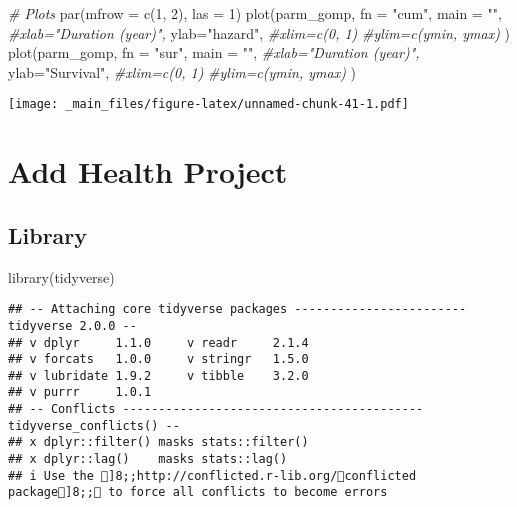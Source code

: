 \documentclass[
]{book}
\newenvironment{Shaded}{\begin{snugshade}}{\end{snugshade}}
\newcommand{\AttributeTok}[1]{\textcolor[rgb]{0.77,0.63,0.00}{#1}}
\newcommand{\CommentTok}[1]{\textcolor[rgb]{0.56,0.35,0.01}{\textit{#1}}}
\newcommand{\DecValTok}[1]{\textcolor[rgb]{0.00,0.00,0.81}{#1}}
\newcommand{\FunctionTok}[1]{\textcolor[rgb]{0.00,0.00,0.00}{#1}}
\newcommand{\NormalTok}[1]{#1}
\newcommand{\StringTok}[1]{\textcolor[rgb]{0.31,0.60,0.02}{#1}}
\begin{document}
\begin{Shaded}
\begin{Highlighting}[]
\CommentTok{\# Plots}
\FunctionTok{par}\NormalTok{(}\AttributeTok{mfrow =} \FunctionTok{c}\NormalTok{(}\DecValTok{1}\NormalTok{, }\DecValTok{2}\NormalTok{), }\AttributeTok{las =} \DecValTok{1}\NormalTok{)}
\FunctionTok{plot}\NormalTok{(parm\_gomp, }
     \AttributeTok{fn =} \StringTok{"cum"}\NormalTok{, }\AttributeTok{main =} \StringTok{""}\NormalTok{, }
     \CommentTok{\#xlab="Duration (year)", }
     \AttributeTok{ylab=}\StringTok{"hazard"}\NormalTok{,}
     \CommentTok{\#xlim=c(0, 1) }
     \CommentTok{\#ylim=c(ymin, ymax)}
\NormalTok{     )}
\FunctionTok{plot}\NormalTok{(parm\_gomp, }
     \AttributeTok{fn =} \StringTok{"sur"}\NormalTok{, }\AttributeTok{main =} \StringTok{""}\NormalTok{, }
     \CommentTok{\#xlab="Duration (year)", }
     \AttributeTok{ylab=}\StringTok{"Survival"}\NormalTok{,}
     \CommentTok{\#xlim=c(0, 1) }
     \CommentTok{\#ylim=c(ymin, ymax)}
\NormalTok{     )}
\end{Highlighting}
\end{Shaded}

\texttt{[image: \_main\_files/figure-latex/unnamed-chunk-41-1.pdf]}

\hypertarget{add-health-project}{%
\chapter{Add Health Project}\label{add-health-project}}

\hypertarget{library}{%
\section{Library}\label{library}}

\begin{Shaded}
\begin{Highlighting}[]
\FunctionTok{library}\NormalTok{(tidyverse)}
\end{Highlighting}
\end{Shaded}

\begin{verbatim}
## -- Attaching core tidyverse packages ------------------------ tidyverse 2.0.0 --
## v dplyr     1.1.0     v readr     2.1.4
## v forcats   1.0.0     v stringr   1.5.0
## v lubridate 1.9.2     v tibble    3.2.0
## v purrr     1.0.1     
## -- Conflicts ------------------------------------------ tidyverse_conflicts() --
## x dplyr::filter() masks stats::filter()
## x dplyr::lag()    masks stats::lag()
## i Use the ]8;;http://conflicted.r-lib.org/conflicted package]8;; to force all conflicts to become errors
\end{verbatim}
\end{document}
